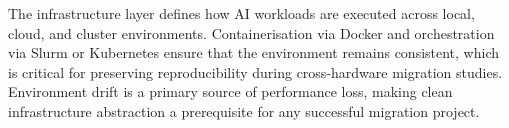 The infrastructure layer defines how AI workloads are executed across
local, cloud, and cluster environments. Containerisation via Docker and
orchestration via Slurm or Kubernetes ensure that the environment remains
consistent, which is critical for preserving reproducibility during
cross-hardware migration studies. Environment drift is a primary source
of performance loss, making clean infrastructure abstraction a prerequisite
for any successful migration project.
